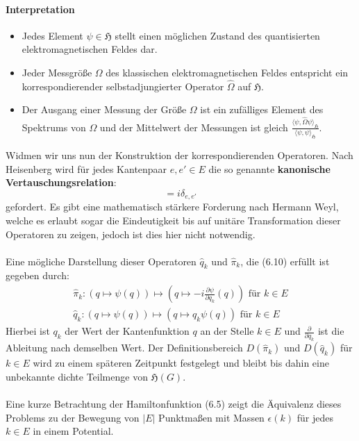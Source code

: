 \documentclass[11pt,a4paper,leqno]{report}
\numberwithin{equation}{chapter}
\begin{document}
\paragraph{Interpretation}
\begin{itemize}
\item Jedes Element $\psi\in\mathfrak{H}$ stellt einen m\"oglichen Zustand des quantisierten elektromagnetischen Feldes dar. 
\item Jeder Messgr\"o\ss{}e $\Omega$ des klassischen elektromagnetischen Feldes entspricht ein korrespondierender selbstadjungierter Operator $\hat{\Omega}$ auf $\mathfrak{H}$. 
\item Der Ausgang einer Messung der Gr\"o\ss{}e $\Omega$ ist ein zuf\"alliges Element des Spektrums von $\Omega$ und der Mittelwert der Messungen ist gleich $\frac{\langle \psi, \hat{\Omega}\psi\rangle_{\mathfrak{H}}}{\langle \psi, \psi\rangle_{\mathfrak{H}}}$.
\end{itemize}
\noindent
Widmen wir uns nun der Konstruktion der korrespondierenden Operatoren. Nach Heisenberg wird f\"ur jedes Kantenpaar $e,e'\in E$ die so genannte \textbf{kanonische Vertauschungsrelation}:
\begin{equation}
	[\hat{q}(e), \hat{\pi}(e')] = i\delta_{e, e'}
\end{equation}
gefordert. Es gibt eine mathematisch st\"arkere Forderung nach Hermann Weyl, welche es erlaubt sogar die Eindeutigkeit bis auf unit\"are Transformation dieser Operatoren zu zeigen, jedoch ist dies hier nicht notwendig.\\
\\
Eine m\"ogliche Darstellung dieser Operatoren $\hat{q}_k$ und $\hat{\pi}_k$, die (6.10) erf\"ullt ist gegeben durch:
\begin{align}
	\hat{\pi}_k:(q\mapsto\psi(q)) \mapsto (q\mapsto -i\frac{\partial\psi}{\partial q_k}(q))\text{  f\"ur }k\in E\\
	\hat{q}_k:(q\mapsto\psi(q)) \mapsto (q\mapsto q_k\psi(q))\text{  f\"ur }k\in E
\end{align}
\noindent
Hierbei ist $q_k$ der Wert der Kantenfunktion $q$ an der Stelle $k\in E$ und $\frac{\partial}{\partial q_k}$ ist die Ableitung nach demselben Wert. Der Definitionsbereich $D(\hat{\pi}_k)$ und $D(\hat{q}_k)$ f\"ur $k\in E$ wird zu einem sp\"ateren Zeitpunkt festgelegt und bleibt bis dahin eine unbekannte dichte Teilmenge von $\mathfrak{H}(G)$.
\\
\\
Eine kurze Betrachtung der Hamiltonfunktion (6.5) zeigt die \"Aquivalenz dieses Problems zu der Bewegung von $|E|$ Punktma\ss{}en mit Massen $\epsilon(k)$ f\"ur jedes $k\in E$ in einem Potential. 
\end{document}

